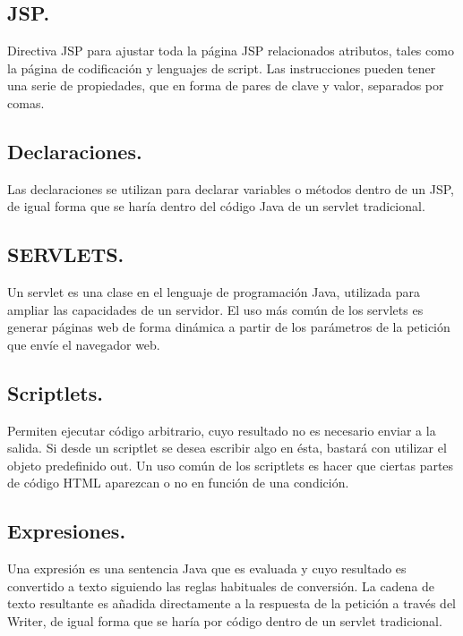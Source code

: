 \documentclass[10pt,a4paper]{article}
\begin{document}
\pagebreak

\section{\color{colorIPN}{Conceptos (generalidades)}}

\subsection{JSP.}
Directiva JSP para ajustar toda la página JSP relacionados atributos, tales como la página de codificación y lenguajes de script. Las instrucciones pueden tener una serie de propiedades, que en forma de pares de clave y valor, separados por comas.

\subsection{Declaraciones.}
Las declaraciones se utilizan para declarar variables o métodos dentro de un JSP, de igual forma que se haría dentro del código Java de un servlet tradicional.

\subsection{SERVLETS.}
Un servlet es una clase en el lenguaje de programación Java, utilizada para ampliar las capacidades de un servidor. El uso más común de los servlets es generar páginas web de forma dinámica a partir de los parámetros de la petición que envíe el navegador web.

\subsection{Scriptlets.}
Permiten ejecutar código arbitrario, cuyo resultado no es necesario enviar a la salida. Si desde un scriptlet se desea escribir algo en ésta, bastará con utilizar el objeto predefinido out. Un uso común de los scriptlets es hacer que ciertas partes de código HTML aparezcan o no en función de una condición.

\subsection{Expresiones.}
Una expresión es una sentencia Java que es evaluada y cuyo resultado es convertido a texto siguiendo las reglas habituales de conversión. La cadena de texto resultante es añadida directamente a la respuesta de la petición a través del Writer, de igual forma que se haría por código dentro de un servlet tradicional.
\end{document}
